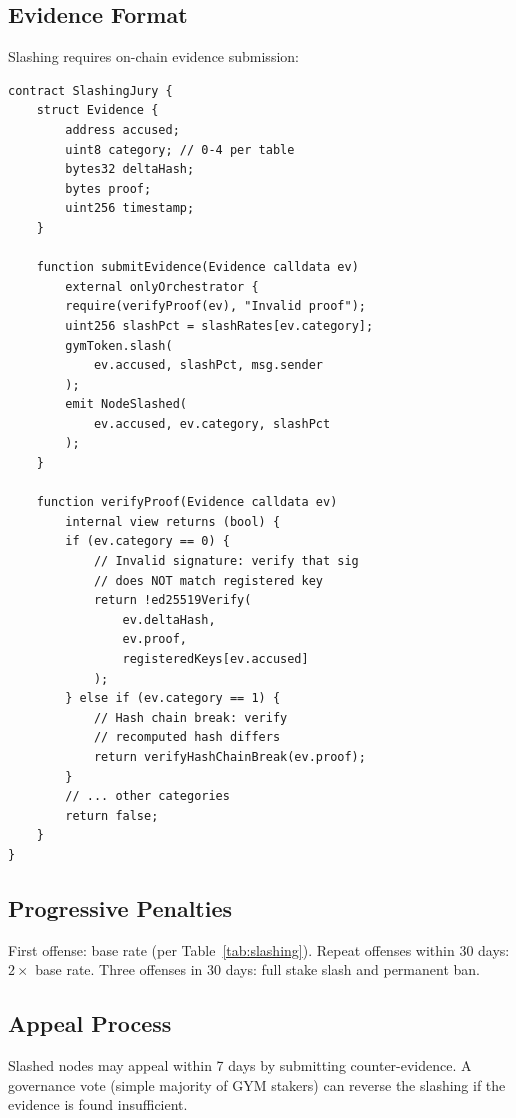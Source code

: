 \documentclass[11pt,letterpaper]{article}
\begin{document}
\subsection{Evidence Format}

Slashing requires on-chain evidence submission:

\begin{lstlisting}[language=Solidity,caption=Slashing evidence contract]
contract SlashingJury {
    struct Evidence {
        address accused;
        uint8 category; // 0-4 per table
        bytes32 deltaHash;
        bytes proof;
        uint256 timestamp;
    }

    function submitEvidence(Evidence calldata ev)
        external onlyOrchestrator {
        require(verifyProof(ev), "Invalid proof");
        uint256 slashPct = slashRates[ev.category];
        gymToken.slash(
            ev.accused, slashPct, msg.sender
        );
        emit NodeSlashed(
            ev.accused, ev.category, slashPct
        );
    }

    function verifyProof(Evidence calldata ev)
        internal view returns (bool) {
        if (ev.category == 0) {
            // Invalid signature: verify that sig
            // does NOT match registered key
            return !ed25519Verify(
                ev.deltaHash,
                ev.proof,
                registeredKeys[ev.accused]
            );
        } else if (ev.category == 1) {
            // Hash chain break: verify
            // recomputed hash differs
            return verifyHashChainBreak(ev.proof);
        }
        // ... other categories
        return false;
    }
}
\end{lstlisting}

\subsection{Progressive Penalties}

First offense: base rate (per Table~\ref{tab:slashing}).  Repeat offenses within 30 days: $2\times$ base rate.  Three offenses in 30 days: full stake slash and permanent ban.

\subsection{Appeal Process}

Slashed nodes may appeal within 7 days by submitting counter-evidence.  A governance vote (simple majority of GYM stakers) can reverse the slashing if the evidence is found insufficient.
\end{document}
